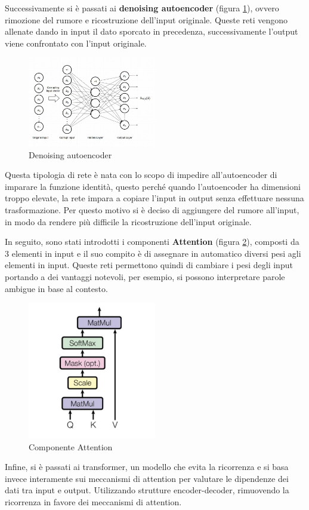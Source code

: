 Successivamente si è passati ai \textbf{denoising autoencoder} (figura
\ref{fig:denoising}), ovvero rimozione del rumore e ricostruzione dell'input
originale. Queste reti vengono allenate dando in input il dato sporcato in
precedenza, successivamente l'output viene confrontato con l'input originale.
\begin{figure}[!ht]
      \centering
      \includegraphics[width=0.5\textwidth]{img/deepl/DenoisingAutoencoder.png}
      \caption{Denoising autoencoder}
      \label{fig:denoising}
\end{figure}
Questa tipologia di rete è nata con lo scopo di impedire all'autoencoder di
imparare la funzione identità, questo perché quando l'autoencoder ha dimensioni
troppo elevate, la rete impara a copiare l'input in output senza effettuare
nessuna trasformazione. Per questo motivo si è deciso di aggiungere del rumore
all'input, in modo da rendere più difficile la ricostruzione dell'input
originale.

In seguito, sono stati introdotti i componenti \textbf{Attention} (figura
\ref{fig:attention}), composti da 3 elementi in input e il suo compito è di
assegnare in automatico diversi pesi agli elementi in input. Queste reti
permettono quindi di cambiare i pesi degli input portando a dei vantaggi notevoli,
per esempio, si possono interpretare parole ambigue in base al contesto.
\begin{figure}[!ht]
      \centering
      \includegraphics[width=0.5\textwidth]{img/deepl/attention.png}
      \caption{Componente Attention}
      \label{fig:attention}
\end{figure}
Infine, si è passati ai transformer, un modello che evita la ricorrenza e si
basa invece interamente sui meccanismi di attention per valutare le dipendenze
dei dati tra input e output. Utilizzando strutture encoder-decoder, rimuovendo
la ricorrenza in favore dei meccanismi di attention.

